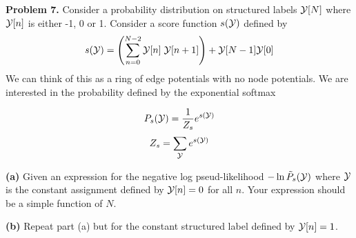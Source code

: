 \documentclass{article}
\newcommand{\solution}[1]{}
\begin{document}
\bigskip
{\bf Problem 7.}  Consider a probability distribution on structured labels ${\cal Y}[N]$ where ${\cal Y}[n]$ is either -1, 0 or 1.  Consider a score function $s({\cal Y})$ defined by
$$s({\cal Y}) =  \left(\sum_{n=0}^{N-2} {\cal Y}[n]\;{\cal Y}[n+1]\right) + {\cal Y}[N-1]{\cal Y}[0]$$
We can think of this as a ring of edge potentials with no node potentials. We are interested in the probability defined by the exponential softmax

$$P_s({\cal Y}) = \frac{1}{Z_s} e^{s({\cal Y})}$$
$$Z_s = \sum_{\cal Y}e^{s({\cal Y})}$$

{\bf (a)} Given an expression for the negative log pseud-likelihood $- \ln \tilde{P}_s({\cal Y})$ where ${\cal Y}$ is the constant assignment defined by ${\cal Y}[n] = 0$ for all $n$.  Your expression should be a simple function of $N$.

\solution{
  \begin{eqnarray*}
    - \ln \tilde{P}({\cal Y}) & = & - \sum_n \ln P_n({\cal Y}[n] \;|\;{\cal Y}/n) \\
    \\
    P_n({\cal Y}[n] \;|\;{\cal Y}/n) & = & \frac{1}{Z_n}e^{s({\cal Y})} \\
    \\
    Z_n & = & e^{s({\cal Y}[n=1])} + e^{s({\cal Y}[n=0])} +e^{s({\cal Y}[n=-1])} \\
    \\
    s({\cal Y}[n=i]) = s({\cal Y}) & = & 0 \\
    \\
    e^{s({\cal Y}[n=i])} & = & 1 \\
    \\
    Z_n & = & 3 \\
    \\
    P_s({\cal Y}[n]\;|\;{\cal Y}/n) & = & 1/3 \\
    \\
    - \ln \tilde{P}({\cal Y}) & = & N \ln \frac{1}{3} \approx 1.1\;N\; \mbox{nats (you didn't have to calculate it)}
  \end{eqnarray*}
}

{\bf (b)}  Repeat part (a) but for the constant structured label defined by ${\cal Y}[n] = 1$.

\solution{
  \begin{eqnarray*}
    Z_n & = & e^{s({\cal Y}[n=1])} + e^{s({\cal Y}[n=0])} +e^{s({\cal Y}[n=-1])} \\
    \\
    s({\cal Y}[n=1]) = s({\cal Y}) & = & N \\
    \\
    s({\cal Y}[n=0]) & = & N-2 \\
    \\
    s({\cal Y}[n=-1]) & = & N-4 \\
    \\
    Z_n & = & e^N(1+e^{-2} + e^{-4}) \\
    \\
    P_s({\cal Y}[n]\;|\;{\cal Y}/n) & = & \frac{1}{1 + e^{-2} + e^{-4}} \approx .87 \\
    \\
    - \ln \tilde{P}({\cal Y}) & = & N \ln \frac{1}{1 + e^{-2} + e^{-4}} \approx .14\;N\; \mbox{nats}.
  \end{eqnarray*}
}
\end{document}
